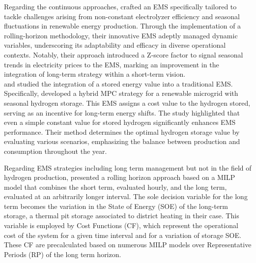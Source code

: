 \begin{frame}
Regarding the continuous approaches, \cite{abomazid_optimal_2022} crafted an EMS specifically tailored to tackle challenges arising from non-constant electrolyzer efficiency and seasonal fluctuations in renewable energy production. Through the implementation of a rolling-horizon methodology, their innovative EMS adeptly managed dynamic variables, underscoring its adaptability and efficacy in diverse operational contexts. Notably, their approach introduced a Z-score factor to signal seasonal trends in electricity prices to the EMS, marking an improvement in the integration of long-term strategy within a short-term vision.
\\
\cite{darivianakis_data-driven_2017} and \cite{thaler_hybrid_2023} studied the integration of a stored energy value into a traditional EMS. Specifically, \cite{thaler_hybrid_2023} developed a hybrid MPC strategy for a renewable microgrid with seasonal hydrogen storage. This EMS assigns a cost value to the hydrogen stored, serving as an incentive for long-term energy shifts. The study highlighted that even a simple constant value for stored hydrogen significantly enhances EMS performance. Their method determines the optimal hydrogen storage value by evaluating various scenarios, emphasizing the balance between production and consumption throughout the year.
\end{frame}

\begin{frame}
Regarding EMS strategies including long term management but not in the field of hydrogen production, \cite{cuisinier_new_2022,cuisinier_impact_2023} presented a rolling horizon approach based on a MILP model that combines the short term, evaluated hourly, and the long term, evaluated at an arbitrarily longer interval.
The sole decision variable for the long term becomes the variation in the State of Energy (SOE) of the long-term storage, a thermal pit storage associated to district heating in their case. This variable is employed by Cost Functions (CF), which represent the operational cost of the system for a given time interval and for a variation of storage SOE. These CF are precalculated based on numerous MILP models over Representative Periods (RP) of the long term horizon.
\end{frame}
